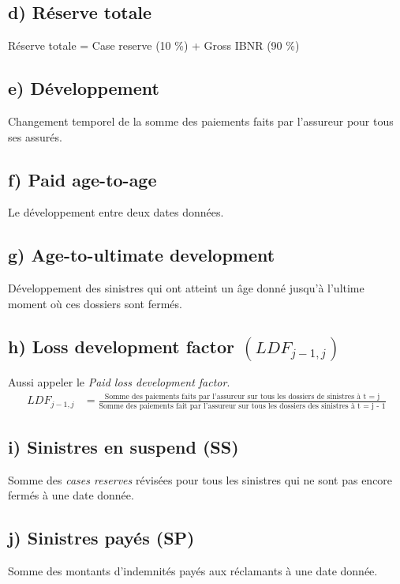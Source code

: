 \subsection*{d) Réserve totale}

Réserve totale = Case reserve (10 \%) + Gross IBNR (90 \%)

\subsection*{e) Développement}

Changement temporel de la somme des paiements faits par l'assureur pour tous ses assurés.

\subsection*{f) Paid age-to-age}

Le développement entre deux dates données.

\subsection*{g) Age-to-ultimate development}
Développement des sinistres qui ont atteint un âge donné jusqu'à l'ultime moment où ces dossiers sont fermés.

\subsection*{h) Loss development factor $(LDF_{j-1, j})$}
Aussi appeler le \emph{Paid loss development factor}.
\begin{align*}
LDF_{j-1, j} & = \frac{\text{Somme des paiements faits par l'assureur sur tous les dossiers de sinistres à t = j}}{\text{Somme des paiements fait par l'assureur sur tous les dossiers des sinistres à t = j - 1}}
\end{align*}

\subsection*{i) Sinistres en suspend (SS)}
Somme des \emph{cases reserves} révisées pour tous les sinistres qui ne sont pas encore fermés à une date donnée.

\subsection*{j) Sinistres payés (SP)}
Somme des montants d'indemnités payés aux réclamants à une date donnée.

